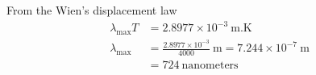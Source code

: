 From the Wien's displacement law
\begin{align*}
\lambda_{\max} T &= 2.8977 \times 10^{-3}~\mathrm{m.K}\\
\lambda_{\max} &= \frac{2.8977 \times 10^{-3}}{4000}~\mathrm{m}
  = 7.244 \times 10^{-7}~\mathrm{m}\\
&= 724~\text{nanometers}
\end{align*}
